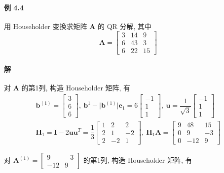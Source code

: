\paragraph*{例 4.4} 用 Householder 变换求矩阵 $\bm{A}$ 的 QR 分解, 其中
$$
    \bm{A} = \begin{bmatrix}
        3 & 14 & 9  \\
        6 & 43 & 3  \\
        6 & 22 & 15
    \end{bmatrix}
$$

\paragraph*{解} 对 $\bm{A}$ 的第1列, 构造 Householder 矩阵, 有
\begin{gather*}
    \bm{b}^{(1)} = \begin{bmatrix}
        3 \\
        6 \\
        6
    \end{bmatrix},\ \bm{b}^{1} - \lvert \bm{b}^{(1)} \rvert \bm{e}_1 = 6\begin{bmatrix}
        -1 \\
        1  \\
        1
    \end{bmatrix},\ \bm{u} = \dfrac{1}{\sqrt{3}}\begin{bmatrix}
        -1 \\
        1  \\
        1
    \end{bmatrix} \\
    \bm{H}_1 = \bm{I} - 2\bm{uu}^T = \dfrac{1}{3}\begin{bmatrix}
        1 & 2  & 2  \\
        2 & 1  & -2 \\
        2 & -2 & 1
    \end{bmatrix},\ \bm{H}_1\bm{A} = \begin{bmatrix}
        9 & 48  & 15 \\
        0 & 9   & -3 \\
        0 & -12 & 9
    \end{bmatrix}
\end{gather*}
\par 对 $\bm{A}^{(1)} = \begin{bmatrix}
        9   & -3 \\
        -12 & 9
    \end{bmatrix}$ 的第1列, 构造 Householder 矩阵, 有
